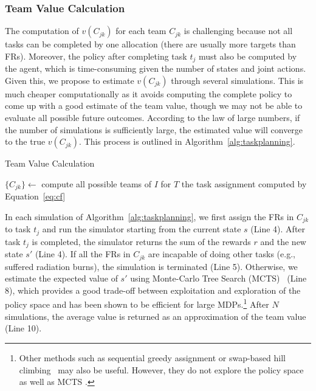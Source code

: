 \subsubsection{Team Value Calculation}
\noindent The computation of $v(C_{jk})$ for each team $C_{jk}$ is
challenging because not all tasks can be completed by one allocation
(there are usually more targets than FRs). Moreover, the policy
after completing task $t_j$ must also be computed by the agent, which
is time-consuming given the number of states and joint actions. Given
this, we propose to estimate $v(C_{jk})$ through several
simulations. This is much cheaper computationally as it avoids
computing the complete policy to come up with a good estimate of the
team value, though we may not be able to evaluate all possible future
outcomes. According to the law of large numbers, if the number of
simulations is sufficiently large, the estimated value will converge
to the true $v(C_{jk})$.  This process is outlined in
Algorithm~\ref{alg:taskplanning}.
\begin{algorithm}[htbp]
  \caption{Team Value Calculation}
  \label{alg:taskplanning}
  \Indm
  \Indp\BlankLine
  $\{ C_{jk} \} \gets$ compute all possible teams of $I$ for
  $T$ \;
  \Return the task assignment computed by Equation~\ref{eq:cf}
\end{algorithm}

In each simulation of Algorithm~\ref{alg:taskplanning}, we first
assign the FRs in $C_{jk}$ to task $t_j$ and run the
simulator starting from the current state $s$ (Line 4). After task
$t_j$ is completed, the simulator returns the sum of the rewards
$r$ and the new state $s'$ (Line 4). If all the FRs in
$C_{jk}$ are incapable of doing other tasks (e.g., suffered
radiation burns), the simulation is terminated (Line
5). Otherwise, we estimate the expected value of $s'$ using
Monte-Carlo Tree Search (MCTS)~\cite{kocsis2006bandit} (Line 8),
which provides a good trade-off between exploitation and exploration
of the policy space and has been shown to be efficient for large
MDPs.\footnote{Other methods such as sequential greedy assignment
or swap-based hill climbing~\cite{proper2009solving} may also be useful. However, they do not explore the policy space as well as MCTS \cite{kocsis2006bandit}.} After $N$ simulations, the average value is returned as an approximation of
the team value (Line 10).

